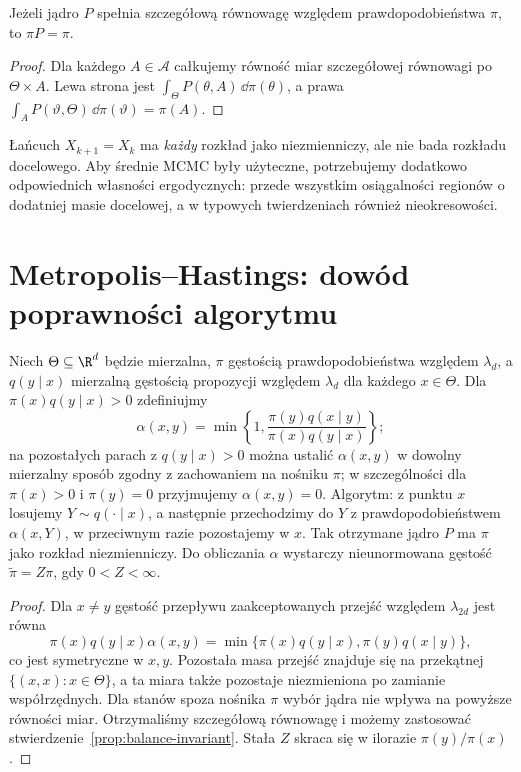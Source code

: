 \begin{stwierdzenie}
\label{prop:balance-invariant}
Jeżeli jądro $P$ spełnia szczegółową równowagę względem
prawdopodobieństwa $\pi$, to $\pi P=\pi$.
\end{stwierdzenie}
\begin{proof}
Dla każdego $A\in\mathcal A$ całkujemy równość miar
szczegółowej równowagi po $\Theta\times A$.
Lewa strona jest $\int_\Theta P(\theta,A)\,\dd\pi(\theta)$,
a prawa $\int_A P(\vartheta,\Theta)\,\dd\pi(\vartheta)=\pi(A)$.
\end{proof}

\begin{uwaga}
Łańcuch $X_{k+1}=X_k$ ma \emph{każdy} rozkład jako
niezmienniczy, ale nie bada rozkładu docelowego.
Aby średnie MCMC były użyteczne, potrzebujemy dodatkowo
odpowiednich własności ergodycznych: przede wszystkim
osiągalności regionów o dodatniej masie docelowej,
a w typowych twierdzeniach również nieokresowości.
\end{uwaga}

\section{Metropolis--Hastings: dowód poprawności algorytmu}
\begin{twierdzenie}
\label{thm:mh-detailed}
Niech $\Theta\subseteq\R^d$ będzie mierzalna,
$\pi$ gęstością prawdopodobieństwa względem $\lambda_d$,
a $q(y\mid x)$ mierzalną gęstością propozycji względem
$\lambda_d$ dla każdego $x\in\Theta$.
Dla $\pi(x)q(y\mid x)>0$ zdefiniujmy
\[
 \alpha(x,y)=\min\left\{1,
 \frac{\pi(y)q(x\mid y)}{\pi(x)q(y\mid x)}\right\};
\]
na pozostałych parach z $q(y\mid x)>0$ można ustalić
$\alpha(x,y)$ w dowolny mierzalny sposób zgodny z
zachowaniem na nośniku $\pi$; w szczególności dla
$\pi(x)>0$ i $\pi(y)=0$ przyjmujemy $\alpha(x,y)=0$.
Algorytm: z punktu $x$ losujemy $Y\sim q(\cdot\mid x)$,
a następnie przechodzimy do $Y$ z prawdopodobieństwem
$\alpha(x,Y)$, w przeciwnym razie pozostajemy w $x$.
Tak otrzymane jądro $P$ ma $\pi$ jako rozkład niezmienniczy.
Do obliczania $\alpha$ wystarczy nieunormowana
gęstość $\widetilde\pi=Z\pi$, gdy $0<Z<\infty$.
\end{twierdzenie}
\begin{proof}
Dla $x\ne y$ gęstość przepływu zaakceptowanych przejść
względem $\lambda_{2d}$ jest równa
\[
 \pi(x)q(y\mid x)\alpha(x,y)
 =\min\{\pi(x)q(y\mid x),\pi(y)q(x\mid y)\},
\]
co jest symetryczne w $x,y$. Pozostała masa przejść
znajduje się na przekątnej $\{(x,x):x\in\Theta\}$,
a ta miara także pozostaje niezmieniona po zamianie
współrzędnych. Dla stanów spoza nośnika $\pi$
wybór jądra nie wpływa na powyższe równości miar.
Otrzymaliśmy szczegółową równowagę i możemy zastosować
stwierdzenie~\ref{prop:balance-invariant}.
Stała $Z$ skraca się w ilorazie $\pi(y)/\pi(x)$.
\end{proof}

